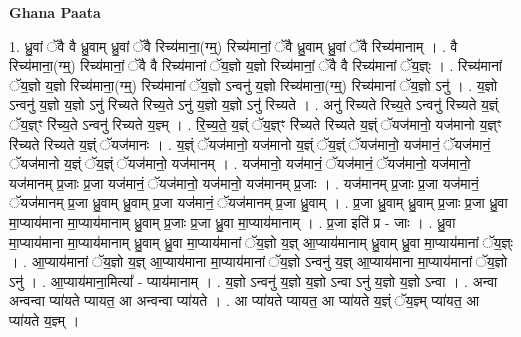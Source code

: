\documentclass[17pt]{extarticle}
\begin{document}
\textbf{Ghana Paata } \newline

1. ध्रु॒वां ॅवै वै ध्रु॒वाम् ध्रु॒वां ॅवै रिच्य॑माना॒(ग्म्॒) रिच्य॑मानां॒ ॅवै ध्रु॒वाम् ध्रु॒वां ॅवै रिच्य॑मानाम् । . वै रिच्य॑माना॒(ग्म्॒) रिच्य॑मानां॒ ॅवै वै रिच्य॑मानां ॅय॒ज्ञो य॒ज्ञो रिच्य॑मानां॒ ॅवै वै रिच्य॑मानां ॅय॒ज्ञ्ः । . रिच्य॑मानां ॅय॒ज्ञो य॒ज्ञो रिच्य॑माना॒(ग्म्॒) रिच्य॑मानां ॅय॒ज्ञो ऽन्वनु॑ य॒ज्ञो रिच्य॑माना॒(ग्म्॒) रिच्य॑मानां ॅय॒ज्ञो ऽनु॑ । . य॒ज्ञो ऽन्वनु॑ य॒ज्ञो य॒ज्ञो ऽनु॑ रिच्यते रिच्य॒ते ऽनु॑ य॒ज्ञो य॒ज्ञो ऽनु॑ रिच्यते । . अनु॑ रिच्यते रिच्य॒ते ऽन्वनु॑ रिच्यते य॒ज्ञ्ं ॅय॒ज्ञ्ꣳ रि॑च्य॒ते ऽन्वनु॑ रिच्यते य॒ज्ञ्म् । . रि॒च्य॒ते॒ य॒ज्ञ्ं ॅय॒ज्ञ्ꣳ रि॑च्यते रिच्यते य॒ज्ञ्ं ॅयज॑मानो॒ यज॑मानो य॒ज्ञ्ꣳ रि॑च्यते रिच्यते य॒ज्ञ्ं ॅयज॑मानः । . य॒ज्ञ्ं ॅयज॑मानो॒ यज॑मानो य॒ज्ञ्ं ॅय॒ज्ञ्ं ॅयज॑मानो॒ यज॑मानं॒ ॅयज॑मानं॒ ॅयज॑मानो य॒ज्ञ्ं ॅय॒ज्ञ्ं ॅयज॑मानो॒ यज॑मानम् । . यज॑मानो॒ यज॑मानं॒ ॅयज॑मानं॒ ॅयज॑मानो॒ यज॑मानो॒ यज॑मानम् प्र॒जाः प्र॒जा यज॑मानं॒ ॅयज॑मानो॒ यज॑मानो॒ यज॑मानम् प्र॒जाः । . यज॑मानम् प्र॒जाः प्र॒जा यज॑मानं॒ ॅयज॑मानम् प्र॒जा ध्रु॒वाम् ध्रु॒वाम् प्र॒जा यज॑मानं॒ ॅयज॑मानम् प्र॒जा ध्रु॒वाम् । . प्र॒जा ध्रु॒वाम् ध्रु॒वाम् प्र॒जाः प्र॒जा ध्रु॒वा मा॒प्याय॑माना मा॒प्याय॑मानाम् ध्रु॒वाम् प्र॒जाः प्र॒जा ध्रु॒वा मा॒प्याय॑मानाम् । . प्र॒जा इति॑ प्र - जाः । . ध्रु॒वा मा॒प्याय॑माना मा॒प्याय॑मानाम् ध्रु॒वाम् ध्रु॒वा मा॒प्याय॑मानां ॅय॒ज्ञो य॒ज्ञ् आ॒प्याय॑मानाम् ध्रु॒वाम् ध्रु॒वा मा॒प्याय॑मानां ॅय॒ज्ञ्ः । . आ॒प्याय॑मानां ॅय॒ज्ञो य॒ज्ञ् आ॒प्याय॑माना मा॒प्याय॑मानां ॅय॒ज्ञो ऽन्वनु॑ य॒ज्ञ् आ॒प्याय॑माना मा॒प्याय॑मानां ॅय॒ज्ञो ऽनु॑ । . आ॒प्याय॑माना॒मित्या᳚ - प्याय॑मानाम् । . य॒ज्ञो ऽन्वनु॑ य॒ज्ञो य॒ज्ञो ऽन्वा ऽनु॑ य॒ज्ञो य॒ज्ञो ऽन्वा । . अन्वा अन्वन्वा प्या॑यते प्यायत॒ आ अन्वन्वा प्या॑यते । . आ प्या॑यते प्यायत॒ आ प्या॑यते य॒ज्ञ्ं ॅय॒ज्ञ्म् प्या॑यत॒ आ प्या॑यते य॒ज्ञ्म् । \newline
\end{document}
